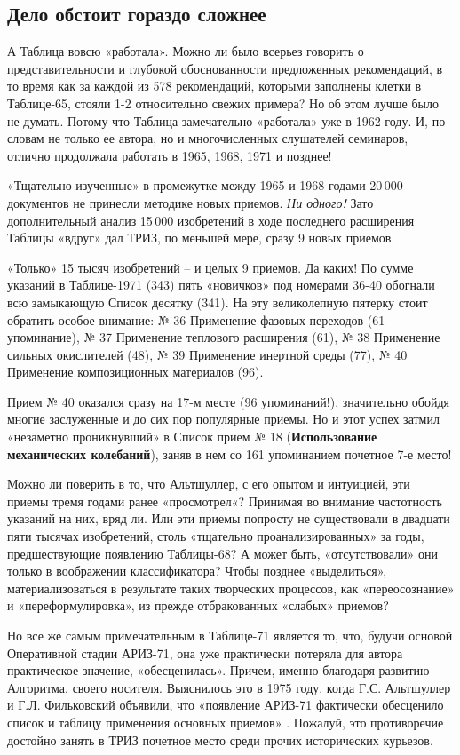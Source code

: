 \documentclass[11pt,a4paper]{article}
\begin{document}
\subsection*{Дело обстоит гораздо сложнее}

А Таблица вовсю «работала». Можно ли было всерьез говорить о
представительности и глубокой обоснованности предложенных рекомендаций, в то
время как за каждой из 578 рекомендаций, которыми заполнены клетки в
Таблице-65, стояли 1-2 относительно свежих примера? Но об этом лучше было не
думать. Потому что Таблица замечательно «работала» уже в 1962 году. И, по
словам не только ее автора, но и многочисленных слушателей семинаров, отлично
продолжала работать в 1965, 1968, 1971 и позднее!

«Тщательно изученные» в промежутке между 1965 и 1968 годами 20\,000 документов
не принесли методике новых приемов. \emph{Ни одного!} Зато дополнительный
анализ 15\,000 изобретений в ходе последнего расширения Таблицы «вдруг» дал
ТРИЗ, по меньшей мере, сразу 9 новых приемов.

«Только» 15 тысяч изобретений -- и целых 9 приемов. Да каких! По сумме
указаний в Таблице-1971 (343) пять «новичков» под номерами 36-40 обогнали всю
замыкающую Список десятку (341). На эту великолепную пятерку стоит обратить
особое внимание: № 36 Применение фазовых переходов (61 упоминание), № 37
Применение теплового расширения (61), № 38 Применение сильных окислителей
(48), № 39 Применение инертной среды (77), № 40 Применение композиционных
материалов (96).

Прием № 40 оказался сразу на 17-м месте (96 упоминаний!), значительно обойдя
многие заслуженные и до сих пор популярные приемы. Но и этот успех затмил
«незаметно проникнувший» в Список прием № 18 (\textbf{Использование
  механических колебаний}), заняв в нем со 161 упоминанием почетное 7-е место!

Можно ли поверить в то, что Альтшуллер, с его опытом и интуицией, эти приемы
тремя годами ранее «просмотрел«? Принимая во внимание частотность указаний на
них, вряд ли. Или эти приемы попросту не существовали в двадцати пяти тысячах
изобретений, столь «тщательно проанализированных» за годы, предшествующие
появлению Таблицы-68? А может быть, «отсутствовали» они только в воображении
классификатора? Чтобы позднее «выделиться», материализоваться в результате
таких творческих процессов, как «переосознание» и «переформулировка», из
прежде отбракованных «слабых» приемов?

Но все же самым примечательным в Таблице-71 является то, что, будучи основой
Оперативной стадии АРИЗ-71, она уже практически потеряла для автора
практическое значение, «обесценилась». Причем, именно благодаря развитию
Алгоритма, своего носителя. Выяснилось это в 1975 году, когда Г.С. Альтшуллер
и Г.Л. Фильковский объявили, что «появление АРИЗ-71 фактически обесценило
список и таблицу применения основных приемов» \cite{Altshuller1975}. Пожалуй,
это противоречие достойно занять в ТРИЗ почетное место среди прочих
исторических курьезов.
\end{document}
